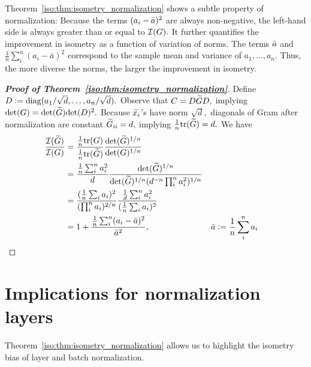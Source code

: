 Theorem~\ref{iso:thm:isometry_normalization} shows a subtle property of normalization: Because the terms $(a_i-\Bar{a})^2$ are always non-negative, the left-hand side is always greater than or equal to $\mathcal{I}(G).$ It further quantifies the improvement in isometry as a function of variation of norms. The terms $\Bar{a}$ and $\frac1n \sum_i^n(a_i-\bar{a})^2$ correspond to the sample mean and variance of $a_1,\dots,a_n.$ 
Thus, the more diverse the norms, the larger the improvement in isometry. 




\begin{proof}[\textbf{Proof of Theorem~\ref{iso:thm:isometry_normalization}}] 
Define $D :=\mathrm{diag}(a_1/\sqrt{d} ,\dots, a_n/\sqrt{d}).$ Observe that $C = D \widetilde{G} D,$ implying $ \text{det}(G) = \text{det}(\widetilde{G}) \text{det}(D)^{2}.$ Because $\widetilde{x_i}$'s have norm $\sqrt{d},$ diagonals of  Gram after normalization are constant $\widetilde{G}_{ii}=d,$ implying $\frac1n\mathrm{tr}(\widetilde{G})= d.$ We have
\begin{align}
\frac{\mathcal{I}(\widetilde{G})}{\mathcal{I}(G)}
&=
\frac{\frac1n\mathrm{tr}(G)}{\frac1n\mathrm{tr}(\widetilde{G})}\frac{\text{det}(\widetilde{G})^{1/n}}{\text{det}(G)^{1/n}}\\
&= \frac{\frac1n\sum_i^n a_i^2}{d}\frac{\text{det}(\widetilde{G})^{1/n}}{\text{det}(\widetilde{G})^{1/n}(d^{-n} \prod_i^n a_i^2)^{1/n}}\\
&= \frac{(\frac1n\sum_i a_i)^2}{(\prod_i^n a_i)^{2/n}}\frac{\frac1d\sum_i^n a_i^2}{(\frac1n\sum_i a_i)^2}\\
&= 1+\frac{\frac1n \sum_i^n(a_i-\bar{a})^2}{\bar{a}^2}, && \bar{a}:=\frac1n\sum_i^n a_i
\end{align}
\end{proof}




\section{Implications for normalization layers}
Theorem~\ref{iso:thm:isometry_normalization} allows us to highlight the isometry bias of layer and batch normalization. 


